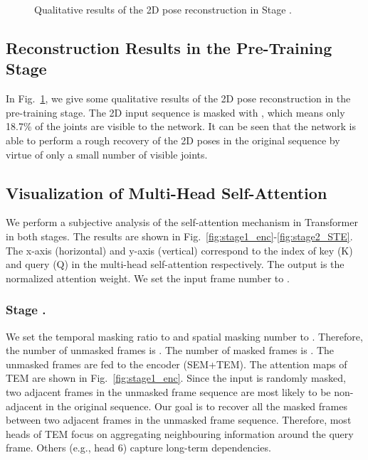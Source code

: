 \documentclass[]{llncs}
\newcommand{\RNum}[1]{\uppercase\expandafter{\romannumeral #1\relax}}
\begin{document}
\begin{figure}[t]
\centering
{}
\vspace{-0.2cm}
\caption{Qualitative results of the 2D pose reconstruction in Stage \RNum{1}.}
\vspace{-0.2cm}
\label{fig:stage1_qualitative}
\end{figure}

\subsection{Reconstruction Results in the Pre-Training Stage}
In Fig.~\ref{fig:stage1_qualitative}, we give some qualitative results of the 2D pose reconstruction in the pre-training stage. The 2D input sequence is masked with , which means only 18.7\% of the joints are visible to the network. It can be seen that the network is able to perform a rough recovery of the 2D poses in the original sequence by virtue of only a small number of visible joints.

\subsection{Visualization of Multi-Head Self-Attention} We perform a subjective analysis of the self-attention mechanism in Transformer in both stages. The results are shown in Fig.~\ref{fig:stage1_enc}-\ref{fig:stage2_STE}. The x-axis (horizontal) and y-axis (vertical) correspond to the index of key (K) and query (Q) in the multi-head self-attention respectively. The output is the normalized attention weight. We set the input frame number to .
\subsubsection{Stage \RNum{1}.} We set the temporal masking ratio to  and spatial masking number to . Therefore, the number of unmasked frames is . The number of masked frames is . The unmasked frames are fed to the encoder (SEM+TEM). The attention maps of TEM are shown in Fig.~\ref{fig:stage1_enc}. Since the input is randomly masked, two adjacent frames in the unmasked frame sequence are most likely to be non-adjacent in the original sequence. Our goal is to recover all the masked frames between two adjacent frames in the unmasked frame sequence. Therefore, most heads of TEM focus on aggregating neighbouring information around the query frame. Others (e.g., head 6) capture long-term dependencies.
\end{document}
